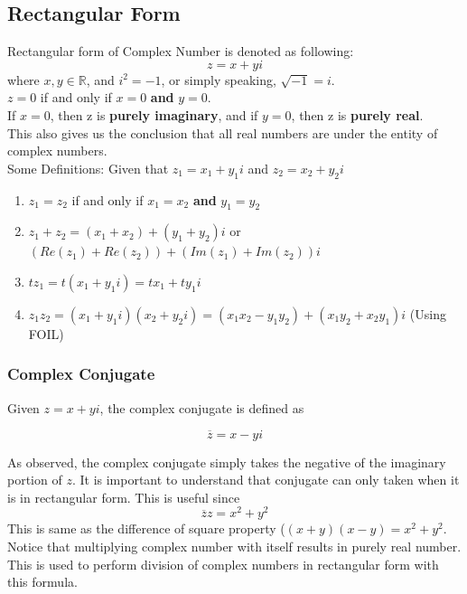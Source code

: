 \documentclass[12pt]{article}
\newcommand{\R}{\mathbb{R}}
\begin{document}
\subsection{Rectangular Form}
Rectangular form of Complex Number is denoted as following:\\
\begin{equation}
z = x+yi
\end{equation}
where $x,y\in \R$, and $i^2 = -1$, or simply speaking, $\sqrt{-1} = i$.\\
$z = 0$ if and only if $x = 0$ \textbf{and} $y = 0$.\\
If $x = 0$, then z is \textbf{purely imaginary}, and if $y = 0$, then z is \textbf{purely real}.\\
This also gives us the conclusion that all real numbers are under the entity of complex numbers. \\
Some Definitions: Given that $z_1 = x_1 + y_1i$ and $z_2 = x_2+y_2i$
\begin{enumerate}
\item $z_1 = z_2$ if and only if $x_1 = x_2$ \textbf{and} $y_1 = y_2$
\item $z_1 + z_2 = (x_1 +  x_2) + (y_1+y_2)i$ or $(Re(z_1) + Re(z_2)) + (Im(z_1)+Im(z_2))i$
\item $tz_1 = t(x_1+y_1i) = tx_1 + ty_1i$
\item $z_1z_2 = (x_1+y_1i)(x_2+y_2i)=(x_1x_2-y_1y_2) + (x_1y_2+x_2y_1)i$ (Using FOIL)
\end{enumerate} \cite{Textbook}

\subsubsection{Complex Conjugate}
Given $z=x+yi$, the complex conjugate is defined as 

\begin{equation}
\overline{z} = x-yi
\end{equation}

As observed, the complex conjugate simply takes the negative of the imaginary portion of $z$. It is important to understand that conjugate can only taken when it is in rectangular form.  This is useful since 
\begin{equation}
\overline{z}z = x^2 + y^2
\end{equation}
This is same as the difference of square property ($(x+y)(x-y) = x^2 + y^2$. Notice that multiplying complex number with itself results in purely real number. This is used to perform division of complex numbers in rectangular form with this formula.\\
\end{document}
